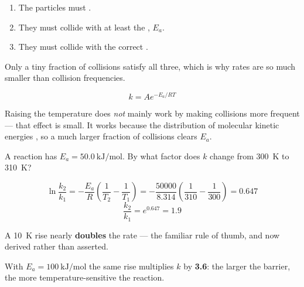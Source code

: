 \documentclass{apchem-notes}
\begin{document}


\begin{enumerate}[leftmargin=*,itemsep=0.3em]
  \item The particles must .
  \item They must collide with at least the
        , $E_a$.
  \item They must collide with the correct
        .
\end{enumerate}

Only a tiny fraction of collisions satisfy all three, which is why rates are
so much smaller than collision frequencies.


\[ k = Ae^{-E_a/RT} \]

Raising the temperature does \emph{not} mainly work by making collisions
more frequent --- that effect is small. It works because the distribution of
molecular kinetic energies , so a much larger
fraction of collisions clears $E_a$.

\begin{workedexample}
A reaction has $E_a = \SI{50.0}{\kilo\joule\per\mole}$. By what factor does
$k$ change from \SI{300}{\kelvin} to \SI{310}{\kelvin}?

\[ \ln\frac{k_2}{k_1} = -\frac{E_a}{R}\left(\frac{1}{T_2} -
   \frac{1}{T_1}\right)
   = -\frac{50000}{8.314}\left(\frac{1}{310} - \frac{1}{300}\right)
   = 0.647 \]
\[ \frac{k_2}{k_1} = e^{0.647} = \mathbf{1.9} \]

A \SI{10}{\kelvin} rise nearly \textbf{doubles} the rate --- the familiar
rule of thumb, and now derived rather than asserted.

With $E_a = \SI{100}{\kilo\joule\per\mole}$ the same rise multiplies $k$ by
\textbf{3.6}: the larger the barrier, the more temperature-sensitive the
reaction.
\end{workedexample}


\end{document}
